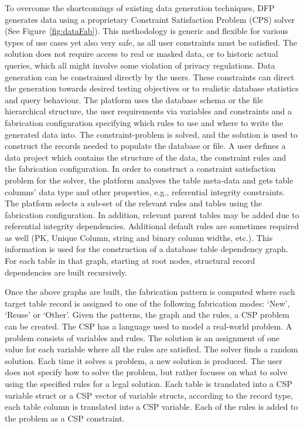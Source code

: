 To overcome the shortcomings of existing data generation techniques, DFP generates data using a proprietary Constraint Satisfaction Problem (CPS) solver (See Figure~\ref{fig:dataFab}). This methodology is generic and flexible for various types of use cases yet also very safe, as all user constraints must be satisfied. The solution does not require access to real or masked data, or to historic actual queries, which all might involve some violation of privacy regulations. Data generation can be constrained directly by the users. These constraints can direct the generation towards desired testing objectives or to realistic database statistics and query behaviour. The platform uses the database schema or the file hierarchical structure, the user requirements via variables and constraints and a fabrication configuration specifying which rules to use and where to write the generated data into. The constraint-problem is solved, and the solution is used to construct the records needed to populate the database or file. A user defines a data project which contains the structure of the data, the constraint rules and the fabrication configuration. In order to construct a constraint satisfaction problem for the solver, the platform analyses the table meta-data and gets table columns’ data type and other properties, e.g., referential integrity constraints. The platform selects a sub-set of the relevant rules and tables using the fabrication configuration. In addition, relevant parent tables may be added due to referential integrity dependencies. Additional default rules are sometimes required as well (PK, Unique Column, string and binary column widths, etc.).
This information is used for the construction of a database table dependency graph. For each table in that graph, starting at root nodes, structural record dependencies are built recursively.

Once the above graphs are built, the fabrication pattern is computed where each target table record is assigned to one of the following fabrication modes: ‘New’, ‘Reuse’ or ‘Other’.
Given the patterns, the graph and the rules, a CSP problem can be created. The CSP has a language used to model a real-world problem. A problem consists of variables and rules. The solution is an assignment of one value for each variable where all the rules are satisfied. The solver finds a random solution. Each time it solves a problem, a new solution is produced. The user does not specify how to solve the problem, but rather focuses on what to solve using the specified rules for a legal solution.
Each table is translated into a CSP variable struct or a CSP vector of variable structs, according to the record type, each table column is translated into a CSP variable. Each of the rules is added to the problem as a CSP constraint.

